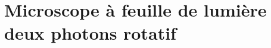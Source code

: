 \chapter[Microscope deux photons rotatif]{Microscope à feuille de lumière deux photons rotatif}\label{chapIV}


%
%   



